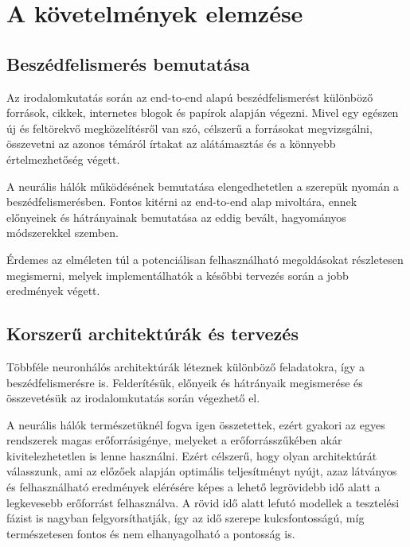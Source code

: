 \chapter{A követelmények elemzése}

\section{Beszédfelismerés bemutatása}

Az irodalomkutatás során az end-to-end alapú beszédfelismerést különböző források, cikkek, internetes blogok és papírok alapján végezni. Mivel egy egészen új és feltörekvő megközelítésről van szó, célszerű a forrásokat megvizsgálni, összevetni az azonos témáról írtakat az alátámasztás és a könnyebb értelmezhetőség végett.

A neurális hálók működésének bemutatása elengedhetetlen a szerepük nyomán a beszédfelismerésben. Fontos kitérni az end-to-end alap mivoltára, ennek előnyeinek és hátrányainak bemutatása az eddig bevált, hagyományos módszerekkel szemben.

Érdemes az elméleten túl a potenciálisan felhasználható megoldásokat részletesen megismerni, melyek implementálhatók a későbbi tervezés során a jobb eredmények végett.

\section{Korszerű architektúrák és tervezés}

Többféle neuronhálós architektúrák léteznek különböző feladatokra, így a beszédfelismerésre is. Felderítésük, előnyeik és hátrányaik megismerése és összevetésük az irodalomkutatás során végezhető el. 

A neurális hálók természetüknél fogva igen összetettek, ezért gyakori az egyes rendszerek magas erőforrásigénye, melyeket a erőforrásszűkében akár kivitelezhetetlen is lenne használni. Ezért célszerű, hogy olyan architektúrát válasszunk, ami az előzőek alapján optimális teljesítményt nyújt, azaz látványos és felhasználható eredmények elérésére képes a lehető legrövidebb idő alatt a legkevesebb erőforrást felhasználva. A rövid idő alatt lefutó modellek a tesztelési fázist is nagyban felgyorsíthatják, így az idő szerepe kulcsfontosságú, míg természetesen fontos és nem elhanyagolható a pontosság is.

